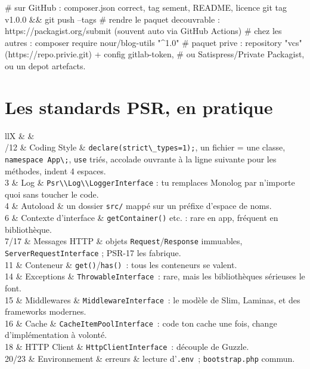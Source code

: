 \begin{terminal}
# sur GitHub : composer.json correct, tag sement, README, licence
git tag v1.0.0 && git push --tags
# rendre le paquet decouvrable : https://packagist.org/submit (souvent auto via GitHub Actions)
# chez les autres : composer require nour/blog-utils "^1.0"
# paquet prive : repository "vcs" (https://repo.privie.git) + config gitlab-token,
#   ou Satispress/Private Packagist, ou un depot artefacts.
\end{terminal}

\section{Les standards PSR, en pratique}

\begin{tabz}{llX}
  \headrow {} \&  \&  \\
  /12 \& Coding Style \& \verb|declare(strict\_types=1);|, un fichier = une classe, \verb|namespace App\;|, \verb|use| tri\'es, accolade ouvrante \`a la ligne suivante pour les m\'ethodes, indent 4 espaces. \\
  3 \& Log \& \verb|Psr\\Log\\LoggerInterface| : tu remplaces Monolog par n'importe quoi sans toucher le code. \\
  4 \& Autoload \& un dossier \verb|src/| mapp\'e sur un pr\'efixe d'espace de noms. \\
  6 \& Contexte d'interface \& \verb|getContainer()| etc. : rare en app, fr\'equent en biblioth\`eque. \\
  7/17 \& Messages HTTP \& objets \verb|Request|/\verb|Response| immuables, \verb|ServerRequestInterface| ; PSR-17 les fabrique. \\
  11 \& Conteneur \& \verb|get()|/\verb|has()|~: tous les conteneurs se valent. \\
  14 \& Exceptions \& \verb|ThrowableInterface|~: rare, mais les biblioth\`eques s\'erieuses le font. \\
  15 \& Middlewares \& \verb|MiddlewareInterface|~: le mod\`ele de Slim, Laminas, et des frameworks modernes. \\
  16 \& Cache \& \verb|CacheItemPoolInterface|~: code ton cache une fois, change d'impl\'ementation \`a volont\'e. \\
  18 \& HTTP Client \& \verb|HttpClientInterface|~: d\'ecouple de Guzzle. \\
  20/23 \& Environnement \& erreurs \& lecture d'\verb|.env|~; \verb|bootstrap.php| commun. \\
\end{tabz}

